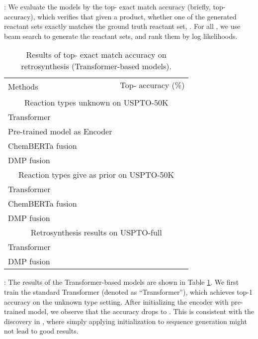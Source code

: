 \documentclass{article}
\newcommand{\ourM}{DMP}
\begin{document}
: We evaluate the models by the top- exact match accuracy (briefly, top- accuracy), which verifies that given a product, whether one of the  generated reactant sets exactly matches the ground truth reactant set, . For all , we use beam search to generate the reactant sets, and rank them by log likelihoods.
\begin{table}[!htbp]
    \centering
    \small
    \begin{tabular}{lcccccc}
    \toprule
         \multirow{2}{*}{Methods} & \multicolumn{6}{c}{Top- accuracy (\%)}  \\
         \cmidrule{2-7}
         & &  & & & & \\
         \midrule
         \multicolumn{7}{c}{Reaction types unknown on USPTO-50K}\\
         \midrule
         Transformer &  &  &  &  &  &  \\
         Pre-trained model as Encoder& &&&&&\\
         ChemBERTa \cite{chithrananda2020chemberta} fusion &&&&&&\\
         \ourM{} fusion &&&&&& \\
         \midrule
         \multicolumn{7}{c}{Reaction types give as prior on USPTO-50K}\\
         \midrule
         Transformer &  &  & && & \\
         ChemBERTa fusion &&&&&&\\
          \ourM{} fusion &&&&&&\\
\midrule
         \multicolumn{7}{c}{Retrosynthesis results on USPTO-full}\\
         \midrule
         Transformer &  &  &  &  &&  \\
\ourM{} fusion &&&&&& \\
         \bottomrule
    \end{tabular}
    \caption{Results of top- exact match accuracy on retrosynthesis (Transformer-based models).}
    \label{tab:retrosys}
\end{table}


: The results of the Transformer-based models are shown in Table \ref{tab:retrosys}. We first train the standard Transformer (denoted as ``Transformer''), which achieves  top-1 accuracy on the unknown type setting. After initializing the encoder with pre-trained model, we observe that the accuracy drops to . This is consistent with the discovery in \cite{zhu2020incorporating}, where simply applying initialization to sequence generation might not lead to good results. 
\end{document}
